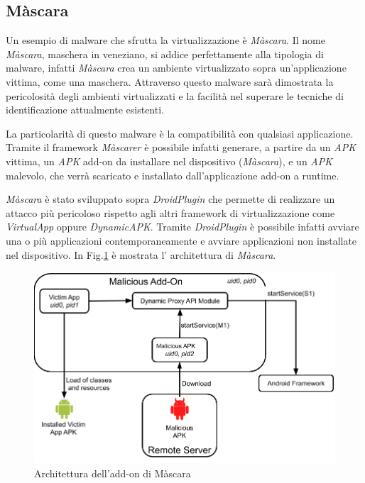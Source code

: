 \subsection*{Màscara}

Un esempio di malware che sfrutta la virtualizzazione è \emph{Màscara}.
Il nome \emph{Màscara}, maschera in veneziano, si addice perfettamente alla tipologia di malware, infatti \emph{Màscara} crea un ambiente virtualizzato sopra un'applicazione vittima, come una maschera.
Attraverso questo malware sarà dimostrata la pericolosità degli ambienti virtualizzati e la facilità nel superare le tecniche di identificazione attualmente esistenti.

La particolarità di questo malware è la compatibilità con qualsiasi applicazione. Tramite il framework \emph{Màscarer} è possibile infatti generare, a partire da un \emph{APK} vittima, un \emph{APK} add-on da installare nel dispositivo (\emph{Màscara}), e un \emph{APK} malevolo, che verrà scaricato e installato dall'applicazione add-on a runtime.

\emph{Màscara} è stato sviluppato sopra \emph{DroidPlugin} che permette di realizzare un attacco più pericoloso rispetto agli altri framework di virtualizzazione come \emph{VirtualApp} oppure \emph{DynamicAPK}. 
Tramite \emph{DroidPlugin} è possibile infatti avviare una o più applicazioni contemporaneamente e avviare applicazioni non installate nel dispositivo.
In Fig.\ref{fig:persona_arch} è mostrata l' architettura di \emph{Màscara}.


\begin{figure} [H]
\includegraphics[width=\textwidth]{figures/PersonaArchitecture}
\caption[Architettura dell'add-on di Màscara]{Architettura dell'add-on di Màscara
\label{fig:persona_arch}}
\end{figure}
\newpage

